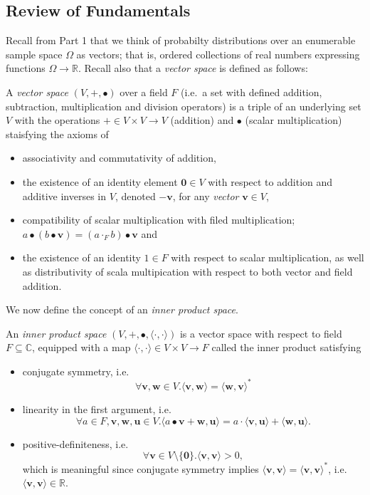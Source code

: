	\subsection{Review of Fundamentals}
	Recall from Part 1 that we think of probabilty distributions over an enumerable sample 
	space $\Omega$ as vectors; that is, ordered collections of real numbers expressing 
	functions $\Omega \rightarrow \mathbb{R}$. Recall also that a \emph{vector space} is 
	defined as follows:
	\begin{definition}
		A \emph{vector space} $(V,+,\bullet)$ over a field $F$ (i.e.\ a set with defined 
		addition, subtraction, multiplication and division operators) is a triple of an 
		underlying set $V$ with the operations $+ \in V \times V \rightarrow V$ (addition) 
		and $\bullet$ (scalar multiplication) staisfying the axioms of 
		\begin{itemize}
			\item associativity and commutativity of addition,
			\item the existence of an identity element $\mathbf{0} \in V$ with respect 
			to addition and additive inverses in $V$, denoted $- \mathbf{v}$, for any 
			\emph{vector} $\mathbf{v} \in V$,
			\item compatibility of scalar multiplication with filed multiplication;
			$a \bullet (b \bullet \mathbf{v}) = (a\cdot_F b) \bullet \mathbf{v}$ and 
			\item the existence of an identity $1 \in F$ with respect to scalar 
			multiplication, as well as distributivity of scala multipication with 
			respect to both vector and field addition.
		\end{itemize}
	\end{definition}
	We now define the concept of an \emph{inner product space}.
	\begin{definition}
		An \emph{inner product space} $(V, +, \bullet, \langle \cdot, \cdot\rangle)$ is a 
		vector space with respect to field $F \subseteq \mathbb{C}$, equipped with a map 
		$\langle\cdot, \cdot\rangle \in V \times V \rightarrow F$ called the inner product 
		satisfying
		\begin{itemize}
			\item conjugate symmetry, i.e.\ 
			$$	
				\forall \mathbf{v}, \mathbf{w} \in V. 
				\langle \mathbf{v},\mathbf{w} \rangle = 
				\langle \mathbf{w}, \mathbf{v} \rangle^*
			$$
			\item linearity in the first argument, i.e.\ 
			$$
			\forall a \in F, \mathbf{v}, \mathbf{w}, \mathbf{u} \in V. 
			\langle a\bullet\mathbf{v} + \mathbf{w}, \mathbf{u}\rangle =
			a\cdot\langle \mathbf{v}, \mathbf{u}\rangle + 
			\langle \mathbf{w}, \mathbf{u}\rangle.
			$$
			\item positive-definiteness, i.e.\ 
			$$
				\forall \mathbf{v} \in V \setminus \{\mathbf{0}\}.
				\langle\mathbf{v}, \mathbf{v} \rangle > 0,
			$$
			which is meaningful since conjugate symmetry implies $\langle\mathbf{v}, 
			\mathbf{v} \rangle = \langle\mathbf{v}, \mathbf{v} \rangle^*$, 
			i.e.\ $\langle\mathbf{v}, \mathbf{v} \rangle \in \mathbb{R}$.
		\end{itemize}
	\end{definition}
